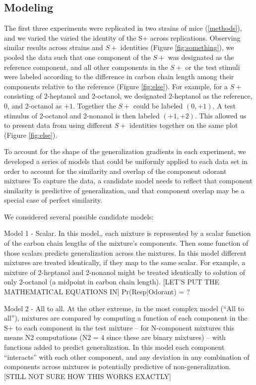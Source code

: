 \subsection{Modeling}

The first three experiments were replicated in two strains of mice (\ref{methods}), and we varied the varied the identity of the S+ across replications.  Observing similar results across strains and $S+$ identities (Figure \ref{fig:something}), we pooled the data such that one component of the $S+$ was designated as the reference component, and all other components in the $S+$ or the test stimuli were labeled according to the difference in carbon chain length among their components relative to the reference (Figure \ref{fig:else}).  For example, for a $S+$ consisting of 2-heptanol and 2-octanol, we designated 2-heptanol as the reference, $0$, and 2-octanol as $+1$.  Together the $S+$ could be labeled $(0,+1)$.  A test stimulus of 2-octanol and 2-nonanol is then labeled $(+1,+2)$.  This allowed us to present data from using different $S+$ identities together on the same plot (Figure \ref{fig:else}).  

To account for the shape of the generalization gradients in each experiment, we developed a series of models that could be uniformly applied to each data set in order to account for  the similarity and overlap of the component odorant mixtures  To capture the data, a candidate model needs to reflect that component similarity is predictive of generalization, and that component overlap may be a special case of perfect similarity.  

We considered several possible candidate models:

Model 1 - Scalar. In this model,, each mixture is represented by a scalar function of the carbon chain lengths of the mixture’s components.  Then some function of those scalars predicts generalization across the mixtures.  In this model different mixtures are treated identically, if they map to the same scalar.  For example, a mixture of 2-heptanol and 2-nonanol might be treated identically to solution of only 2-octanol (a midpoint in carbon chain length).  [LET’S PUT THE  MATHEMATICAL EQUATIONS IN]
Pr(Resp|Odorant) =  ? 

Model 2 - All to all.
At the other extreme, in the most complex model (“All to all”), mixtures are compared by computing a function of each component in the S+ to each component in the test mixture -- for N-component mixtures this means N2 computations (N2 = 4 since these are binary mixtures) -- with functions added to predict generalization.  In this model each component “interacts” with each other component, and any deviation in any combination of components across mixtures is potentially predictive of non-generalization.  
[STILL NOT SURE HOW THIS WORKS EXACTLY]

